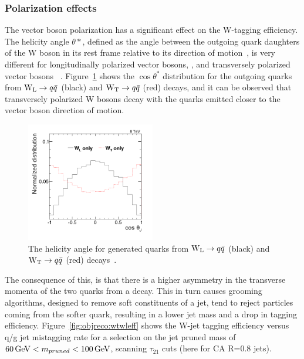 \subsubsection{Polarization effects}
\label{sec:objreco:pol}
The vector boson polarization has a significant effect on the W-tagging efficiency. The helicity angle $\theta*$, defined as the angle between the outgoing quark daughters of the W boson in its rest frame relative to its direction of motion~\cite{PhysRevD.86.095031}, is very different for longitudinally polarized vector bosons, \PWL, and transversely polarized vector bosons \PWT ~\cite{Khachatryan:2014vla}. Figure~\ref{fig:objreco:wtwlcostheta} shows the $\cos \theta^*$ distribution for the outgoing quarks from $\mathrm{W}_{\mathrm{L}} \rightarrow q \bar {q}$ (black) and $\mathrm{W}_{\mathrm{T}} \rightarrow q \bar{q}$ (red) decays, and it can be observed that transversely polarized W bosons decay with the quarks emitted closer to the vector boson direction of motion.
\begin{figure}[h!] 
    \centering 
    \includegraphics[width=0.5\textwidth]{figures/event_reconstruction/cosThetaJJ_GEN.png}
     \caption{The helicity angle for generated quarks from $\mathrm{W}_{\mathrm{L}}\rightarrow q\bar{q}$ (black) and $\mathrm{W}_{\mathrm{T}}\rightarrow q\bar{q}$ (red) decays~\cite{Khachatryan:2014vla}.}
     \label{fig:objreco:wtwlcostheta}
 \end{figure}
The consequence of this, is that there is a higher asymmetry in the transverse momenta of the two quarks from a \PWT decay. This in turn causes grooming algorithms, designed to remove soft constituents of a jet, tend to reject particles coming from the softer quark, resulting in a lower jet mass and a drop in tagging efficiency. Figure~\ref{fig:objreco:wtwleff} shows the W-jet tagging efficiency versus q/g jet mistagging rate for a selection on the jet pruned mass of $60 \,\text{Ge\hspace{-.08em}V} < m_{pruned} < 100 \,\text{Ge\hspace{-.08em}V}$, scanning $\tau_{21}$ cuts (here for CA R=0.8 jets).

